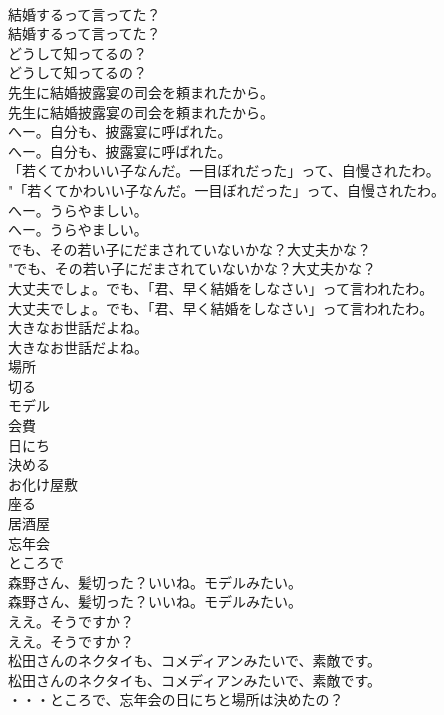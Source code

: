 \documentclass[8pt]{extreport}
\begin{document}
\begin{CJK}{UTF8}{min}
\\	結婚するって言ってた？	
\\	結婚するって言ってた？ 
\\	どうして知ってるの？	
\\	どうして知ってるの？ 
\\	先生に結婚披露宴の司会を頼まれたから。	
\\	先生に結婚披露宴の司会を頼まれたから。 
\\	へー。自分も、披露宴に呼ばれた。	
\\	へー。自分も、披露宴に呼ばれた。 
\\	「若くてかわいい子なんだ。一目ぼれだった」って、自慢されたわ。	
\\	"「若くてかわいい子なんだ。一目ぼれだった」って、自慢されたわ。 
\\	へー。うらやましい。	
\\	へー。うらやましい。 
\\	でも、その若い子にだまされていないかな？大丈夫かな？	
\\	"でも、その若い子にだまされていないかな？大丈夫かな？ 
\\	大丈夫でしょ。でも、「君、早く結婚をしなさい」って言われたわ。	
\\	大丈夫でしょ。でも、「君、早く結婚をしなさい」って言われたわ。 
\\	大きなお世話だよね。	
\\	大きなお世話だよね。 
\\	場所
\\	切る
\\	モデル
\\	会費
\\	日にち
\\	決める
\\	お化け屋敷
\\	座る
\\	居酒屋
\\	忘年会
\\	ところで
\\	森野さん、髪切った？いいね。モデルみたい。	
\\	森野さん、髪切った？いいね。モデルみたい。 
\\	ええ。そうですか？	
\\	ええ。そうですか？ 
\\	松田さんのネクタイも、コメディアンみたいで、素敵です。	
\\	松田さんのネクタイも、コメディアンみたいで、素敵です。 
\\	・・・ところで、忘年会の日にちと場所は決めたの？	

\end{CJK}
\end{document}
